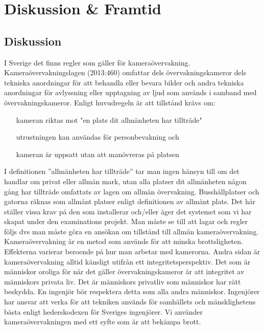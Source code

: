 
\chapter{Diskussion \& Framtid} %
\label{ch:diskussion}


\ifpdf
    \graphicspath{{7/figures/PNG/}{7/figures/PDF/}{7/figures/}}
\else
    \graphicspath{{7/figures/EPS/}{7/figures/}}
\fi





\section{Diskussion}
I Sverige det finns regler som gäller för kameraövervakning. Kameraövervakningslagen (2013:460) omfattar dels övervakningskameror dels tekniska anordningar för att behandla eller bevara bilder och andra tekniska anordningar för avlyssning eller upptagning av ljud som används i samband med övervakningskameror. 
Enligt huvudregeln är att tillstånd krävs om:

\begin{itemize}
\item[kameran riktas mot "en plats dit allmänheten har tillträde"]

\item[utrustningen kan användas för personbevakning och]

\item[kameran är uppsatt utan att manövreras på platsen]
\end{itemize}
I definitionen ”allmänheten har tillträde” tar man ingen hänsyn till om det handlar om privat eller allmän mark, utan alla platser dit allmänheten någon gång har tillträde omfattats av lagen om allmän övervakning. Busshållplatser och gatorna räknas som allmänt platser enligt definitionen av allmänt plats.  Det här ställer vissa krav på den som installerar och/eller äger det systemet som vi har skapat under den examinations projekt. Man måste se till att lagar och regler följs dvs man måste göra en ansökan om tillstånd till allmän kameraövervakning. 
Kameraövervakning är en metod som används för att minska brottsligheten. Effekterna varierar beroende på hur man arbetar med kamerorna. Andra sidan är kameraövervakning alltid känsligt utifrån ett integritetsperspektiv. Det som är människor oroliga för när det gäller övervakningskameror är att integritet av människors privata liv.  Det är människors privatliv som människor har rätt beskydda. En ingenjör bör respektera detta som alla andra människor. Ingenjörer har ansvar att verka för att tekniken används för samhällets och mänsklighetens bästa enligt hederskodexen för Sveriges ingenjörer. Vi använder kameraövervakningen med ett syfte som är att bekämpa brott. 




